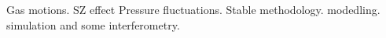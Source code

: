 
%
%




Gas motions. SZ effect Pressure fluctuations. Stable methodology. modedling. simulation and some interferometry. \\



%